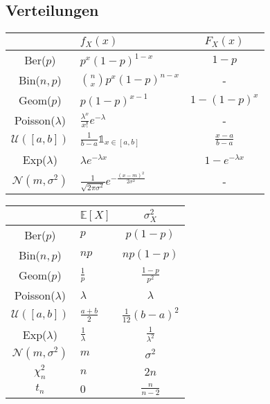 \documentclass[a4paper,10pt]{article}
\def\E{\mathbb{E}}
\begin{document}
\subsection{Verteilungen}

\newcommand{\uniformpdf}{%
\frac{1}{b-a}\mathbb{1}_{x\in[a,b]}
}

\newcommand{\binompdf}{%
    \binom{n}{x}p^x(1-p)^{n-x}
}

\newcommand{\normalpdf}{%
    \frac{1}{\sqrt{2\pi\sigma^2}} e^{-\frac{(x-m)^2}{2\sigma^2}}
}
\begin{tabularx}{\linewidth}{c>{\centering\arraybackslash}Xc}
                           & \(f_X(x)\)               & \(F_X(x)\)          \\
    \toprule
    Ber(\(p\))             & \(p^x(1-p)^{1-x}\)       & \(1-p\)             \\
    Bin(\(n,p\))           & \(\binompdf\)            & -                   \\
    Geom(\(p\))            & \(p(1-p)^{x-1}\)         & \(1-(1-p)^x\)       \\
    Poisson(\(λ\))         & \(\frac{λ^x}{x!}e^{-λ}\) & -                   \\
    \(\mathcal{U}([a,b])\) & \(\uniformpdf\)          & \(\frac{x-a}{b-a}\) \\
    Exp(\(\lambda\))       & \(λe^{-λx}\)             & \(1-e^{-λx}\)       \\
    \(\mathcal{N}(m,σ^2)\) & \(\normalpdf\)           & -                   \\
    \bottomrule
\end{tabularx}

\begin{center}
    \begin{tabularx}{\linewidth}{c>{\centering\arraybackslash}Xc}
                               & \(\E[X]\)         & \(\sigma^2_X\)          \\
        \toprule
        Ber(\(p\))             & \(p\)             & \(p(1-p)\)              \\
        Bin(\(n,p\))           & \(np\)            & \(np(1-p)\)             \\
        Geom(\(p\))            & \(\frac{1}{p}\)   & \(\frac{1-p}{p^2}\)     \\
        Poisson(\(λ\))         & \(λ\)             & \(\lambda\)             \\
        \(\mathcal{U}([a,b])\) & \(\frac{a+b}{2}\) & \(\frac{1}{12}(b-a)^2\) \\
        Exp(\(\lambda\))       & \(\frac{1}{λ}\)   & \(\frac{1}{\lambda^2}\) \\
        \(\mathcal{N}(m,σ^2)\) & \(m\)             & \(\sigma^2\)            \\
        \(\chi_n^2\)             & \(n\)             & \(2n\)                  \\
        \(t_n\)                & \(0\)             & \(\frac{n}{n-2}\)       \\
        \bottomrule
    \end{tabularx}
\end{center}
\end{document}
